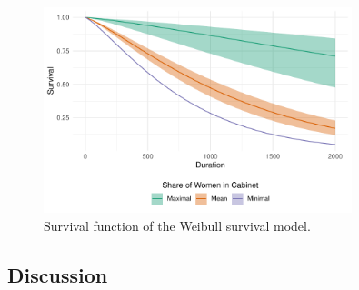 \documentclass[11pt]{article}
\newcommand\minp[1]{\begin{minipage}{0.8\textwidth} #1 \end{minipage}}
\begin{document}
\begin{figure}[!ht]
    \centering
    \minp{\caption{Survival function of the Weibull survival model.} \label{fig:weib_survplot}}
    \includegraphics[width = 0.8\textwidth]{figures/fig4_weib_survplot.pdf}
\end{figure}

\subsection{Discussion}

\clearpage

\printbibliography

\newpage


\end{document}
